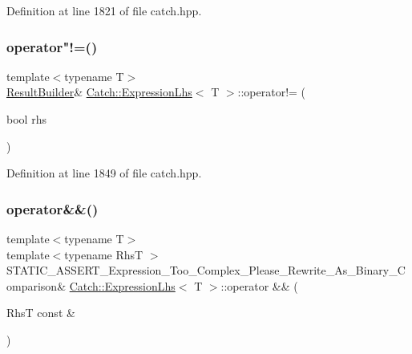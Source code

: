 Definition at line 1821 of file catch.\+hpp.

\hypertarget{class_catch_1_1_expression_lhs_a71e48da9a894962e8b32a8af5359a4df}{}\label{class_catch_1_1_expression_lhs_a71e48da9a894962e8b32a8af5359a4df} 
\subsubsection{\texorpdfstring{operator"!=()}{operator!=()}\hspace{0.1cm}{\footnotesize\ttfamily [2/2]}}
{\footnotesize\ttfamily template$<$typename T$>$ \\
\hyperlink{class_catch_1_1_result_builder}{Result\+Builder}\& \hyperlink{class_catch_1_1_expression_lhs}{Catch\+::\+Expression\+Lhs}$<$ T $>$\+::operator!= (\begin{DoxyParamCaption}\item[{bool}]{rhs }\end{DoxyParamCaption})\hspace{0.3cm}{\ttfamily [inline]}}



Definition at line 1849 of file catch.\+hpp.

\hypertarget{class_catch_1_1_expression_lhs_acbda1f937f8bd5b9da649626cc0b0f54}{}\label{class_catch_1_1_expression_lhs_acbda1f937f8bd5b9da649626cc0b0f54} 
\subsubsection{\texorpdfstring{operator\&\&()}{operator\&\&()}}
{\footnotesize\ttfamily template$<$typename T$>$ \\
template$<$typename RhsT $>$ \\
S\+T\+A\+T\+I\+C\+\_\+\+A\+S\+S\+E\+R\+T\+\_\+\+Expression\+\_\+\+Too\+\_\+\+Complex\+\_\+\+Please\+\_\+\+Rewrite\+\_\+\+As\+\_\+\+Binary\+\_\+\+Comparison\& \hyperlink{class_catch_1_1_expression_lhs}{Catch\+::\+Expression\+Lhs}$<$ T $>$\+::operator \&\& (\begin{DoxyParamCaption}\item[{RhsT const \&}]{ }\end{DoxyParamCaption})}

